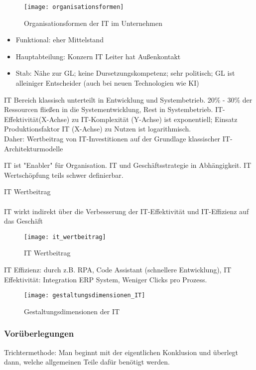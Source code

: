\begin{figure}[H]
    \caption{Organisationsformen der IT im Unternehmen}
    \texttt{[image: organisationsformen]}
    \\
    \cite[Quelle: Vgl.][]{FOM}
\end{figure}

\begin{itemize}
    \item Funktional: eher Mittelstand
    \item Hauptabteilung: Konzern IT Leiter hat Außenkontakt
    \item Stab: Nähe zur GL; keine Dursetzungskompetenz; sehr politisch; GL ist alleiniger Entscheider (auch bei neuen Technologien wie KI)
\end{itemize}

IT Bereich klassisch unterteilt in Entwicklung und Systembetrieb. 20\% - 30\% der Ressourcen fließen in die Systementwicklung, Rest in Systembetrieb. IT-Effektivität(X-Achse) zu IT-Komplexität (Y-Achse) ist exponentiell; Einsatz Produktionsfaktor IT (X-Achse) zu Nutzen ist logarithmisch. 
\\Daher: Wertbeitrag von IT-Investitionen auf der Grundlage klassischer IT-Architekturmodelle

IT ist "Enabler" für Organisation. IT und Geschäftsstrategie in Abhängigkeit. IT Wertschöpfung teils schwer definierbar. 

IT Wertbeitrag\\
\\IT wirkt indirekt über die Verbesserung der IT-Effektivität und IT-Effizienz auf das Geschäft
\begin{figure}[H]
    \caption{IT Wertbeitrag}
    \texttt{[image: it\_wertbeitrag]}
    \\
    \cite[Quelle: Vgl.][]{FOM}
\end{figure}
IT Effizienz: durch z.B. RPA, Code Assistant (schnellere Entwicklung), 
IT Effektivität: Integration ERP System, Weniger Clicks pro Prozess.

\begin{figure}[H]
    \caption{Gestaltungsdimensionen der IT}
    \texttt{[image: gestaltungsdimensionen\_IT]}
    \\
    \cite[Quelle: Vgl.][]{FOM}
\end{figure}



\subsubsection{Vorüberlegungen}
Trichtermethode: Man beginnt mit der eigentlichen  Konklusion und überlegt dann, welche allgemeinen Teile dafür benötigt werden.

